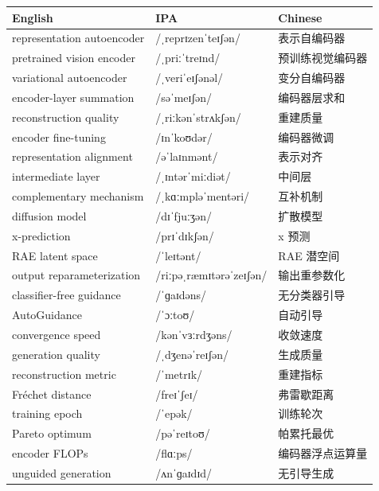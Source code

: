 \documentclass[UTF8,12pt,a4paper]{ctexart}
\providecommand{\zh}[1]{#1}
\begin{document}
\begin{tabular*}{\textwidth}{@{\extracolsep{\fill}}lll@{}}
\toprule
\textbf{English} & \textbf{IPA} & \textbf{Chinese} \\
\midrule
representation autoencoder & {\ipafont /ˌreprɪzenˈteɪʃən/} & \zh{表示自编码器} \\
pretrained vision encoder & {\ipafont /ˌpriːˈtreɪnd/} & \zh{预训练视觉编码器} \\
variational autoencoder & {\ipafont /ˌveriˈeɪʃənəl/} & \zh{变分自编码器} \\
encoder-layer summation & {\ipafont /səˈmeɪʃən/} & \zh{编码器层求和} \\
reconstruction quality & {\ipafont /ˌriːkənˈstrʌkʃən/} & \zh{重建质量} \\
encoder fine-tuning & {\ipafont /ɪnˈkoʊdər/} & \zh{编码器微调} \\
representation alignment & {\ipafont /əˈlaɪnmənt/} & \zh{表示对齐} \\
intermediate layer & {\ipafont /ˌɪntərˈmiːdiət/} & \zh{中间层} \\
complementary mechanism & {\ipafont /ˌkɑːmpləˈmentəri/} & \zh{互补机制} \\
diffusion model & {\ipafont /dɪˈfjuːʒən/} & \zh{扩散模型} \\
x-prediction & {\ipafont /prɪˈdɪkʃən/} & \zh{x 预测} \\
RAE latent space & {\ipafont /ˈleɪtənt/} & \zh{RAE 潜空间} \\
output reparameterization & {\ipafont /riːpəˌræmɪtərəˈzeɪʃən/} & \zh{输出重参数化} \\
classifier-free guidance & {\ipafont /ˈɡaɪdəns/} & \zh{无分类器引导} \\
AutoGuidance & {\ipafont /ˈɔːtoʊ/} & \zh{自动引导} \\
convergence speed & {\ipafont /kənˈvɜːrdʒəns/} & \zh{收敛速度} \\
generation quality & {\ipafont /ˌdʒenəˈreɪʃən/} & \zh{生成质量} \\
reconstruction metric & {\ipafont /ˈmetrɪk/} & \zh{重建指标} \\
Fréchet distance & {\ipafont /freɪˈʃeɪ/} & \zh{弗雷歇距离} \\
training epoch & {\ipafont /ˈepək/} & \zh{训练轮次} \\
Pareto optimum & {\ipafont /pəˈreɪtoʊ/} & \zh{帕累托最优} \\
encoder FLOPs & {\ipafont /flɑːps/} & \zh{编码器浮点运算量} \\
unguided generation & {\ipafont /ʌnˈɡaɪdɪd/} & \zh{无引导生成} \\

\end{tabular*}
\end{document}
